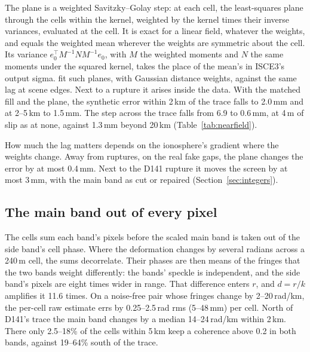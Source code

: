 The plane is a weighted Savitzky--Golay step: at each cell, the least-squares plane through the cells within the
kernel, weighted by the kernel times their inverse variances, evaluated at the cell. It is exact for a linear field,
whatever the weights, and equals the weighted mean wherever the weights are symmetric about the cell. Its variance
$e_0^\top M^{-1} N M^{-1} e_0$, with $M$ the weighted moments and $N$ the same moments under the squared kernel, takes
the place of the mean's in ISCE3's output sigma. \citet{piromthong2026ionospheric} fit such planes, with Gaussian
distance weights, against the same lag at scene edges. Next to a rupture it arises inside the data. With the matched
fill and the plane, the synthetic error within 2\,km of the trace falls to 2.0\,mm and at 2--5\,km to 1.5\,mm. The step
across the trace falls from 6.9 to 0.6\,mm, at 4\,m of slip as at none, against 1.3\,mm beyond 20\,km
(Table~\ref{tab:nearfield}).

How much the lag matters depends on the ionosphere's gradient where the weights change. Away from ruptures, on the real
fake gaps, the plane changes the error by at most 0.4\,mm. Next to the D141 rupture it moves the screen by at most
3\,mm, with the main band as cut or repaired (Section~\ref{sec:integers}).

\subsection{The main band out of every pixel}
\label{sec:pixel}
The cells sum each band's pixels before the scaled main band is taken out of the side band's cell phase. Where the
deformation changes by several radians across a 240\,m cell, the sums decorrelate. Their phases are then means of the
fringes that the two bands weight differently: the bands' speckle is independent, and the side band's pixels are eight
times wider in range. That difference enters $r$, and $d = r/k$ amplifies it 11.6 times. On a noise-free pair whose
fringes change by 2--20\,rad/km, the per-cell raw estimate errs by 0.25--2.5\,rad rms (5--48\,mm) per cell. North of
D141's trace the main band changes by a median 14--24\,rad/km within 2\,km. There only 2.5--18\% of the cells within
5\,km keep a coherence above 0.2 in both bands, against 19--64\% south of the trace.

